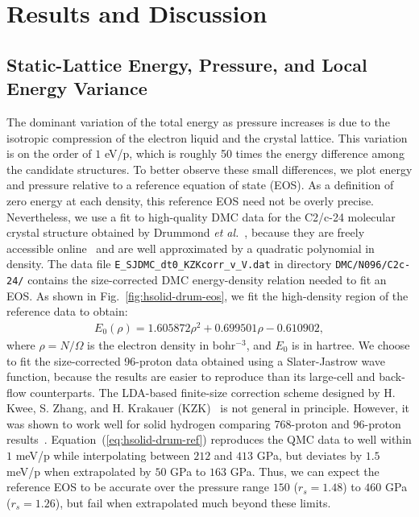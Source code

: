 \section{Results and Discussion}
\label{sec:hsolid-results}

\subsection{Static-Lattice Energy, Pressure, and Local Energy Variance}

The dominant variation of the total energy as pressure increases is due to the isotropic compression of the electron liquid and the crystal lattice. This variation is on the order of $1$ eV/p, which is roughly 50 times the energy difference among the candidate structures.
To better observe these small differences, we plot energy and pressure relative to a reference equation of state (EOS).
As a definition of zero energy at each density, this reference EOS need not be overly precise.
Nevertheless, we use a fit to high-quality DMC data for the C2/c-24 molecular crystal structure obtained by Drummond \textit{et al.}~\cite{Drummond2015}, because they are freely accessible online~\cite{drum-eos} and are well approximated by a quadratic polynomial in density.
The data file \verb|E_SJDMC_dt0_KZKcorr_v_V.dat| in directory \verb|DMC/N096/C2c-24/| contains the size-corrected DMC energy-density relation needed to fit an EOS.
As shown in Fig.~\ref{fig:hsolid-drum-eos}, we fit the high-density region of the reference data to obtain:
\begin{align}
E_0(\rho) = 1.605872\rho^2 + 0.699501\rho - 0.610902,
\label{eq:hsolid-drum-ref}
\end{align}
where $\rho=N/\Omega$ is the electron density in bohr$^{-3}$, and $E_0$ is in hartree.
We choose to fit the size-corrected 96-proton data obtained using a Slater-Jastrow wave function, because the results are easier to reproduce than its large-cell and back-flow counterparts.
The LDA-based finite-size correction scheme designed by H. Kwee, S. Zhang, and H. Krakauer (KZK)~\cite{Kwee2008} is not general in principle.
However, it was shown to work well for solid hydrogen comparing 768-proton and 96-proton results~\cite{Drummond2015}.
Equation~(\ref{eq:hsolid-drum-ref}) reproduces the QMC data to well within $1$ meV/p while interpolating between $212$ and $413$ GPa, but deviates by $1.5$ meV/p when extrapolated by $50$ GPa to $163$ GPa.
Thus, we can expect the reference EOS to be accurate over the pressure range $150$ ($r_s=1.48$) to $460$ GPa ($r_s=1.26$), but fail when extrapolated much beyond these limits.

